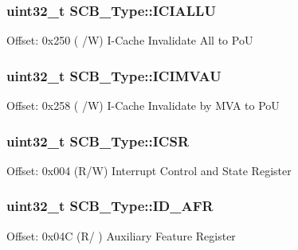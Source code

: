 \subsubsection[{\texorpdfstring{I\+C\+I\+A\+L\+LU}{ICIALLU}}]{ uint32\+\_\+t S\+C\+B\+\_\+\+Type\+::\+I\+C\+I\+A\+L\+LU}\hypertarget{structSCB__Type_ad323c3f1f75c8f6971214146a566dc8c}{}\label{structSCB__Type_ad323c3f1f75c8f6971214146a566dc8c}
Offset\+: 0x250 ( /W) I-\/\+Cache Invalidate All to PoU 
\subsubsection[{\texorpdfstring{I\+C\+I\+M\+V\+AU}{ICIMVAU}}]{ uint32\+\_\+t S\+C\+B\+\_\+\+Type\+::\+I\+C\+I\+M\+V\+AU}\hypertarget{structSCB__Type_a86c0feeceb540651e6ca01af397e7c9c}{}\label{structSCB__Type_a86c0feeceb540651e6ca01af397e7c9c}
Offset\+: 0x258 ( /W) I-\/\+Cache Invalidate by M\+VA to PoU 
\subsubsection[{\texorpdfstring{I\+C\+SR}{ICSR}}]{ uint32\+\_\+t S\+C\+B\+\_\+\+Type\+::\+I\+C\+SR}\hypertarget{structSCB__Type_a3e66570ab689d28aebefa7e84e85dc4a}{}\label{structSCB__Type_a3e66570ab689d28aebefa7e84e85dc4a}
Offset\+: 0x004 (R/W) Interrupt Control and State Register 
\subsubsection[{\texorpdfstring{I\+D\+\_\+\+A\+FR}{ID_AFR}}]{ uint32\+\_\+t S\+C\+B\+\_\+\+Type\+::\+I\+D\+\_\+\+A\+FR}\hypertarget{structSCB__Type_acb57cbc70338c6acc607ec6b241a848c}{}\label{structSCB__Type_acb57cbc70338c6acc607ec6b241a848c}
Offset\+: 0x04C (R/ ) Auxiliary Feature Register 
